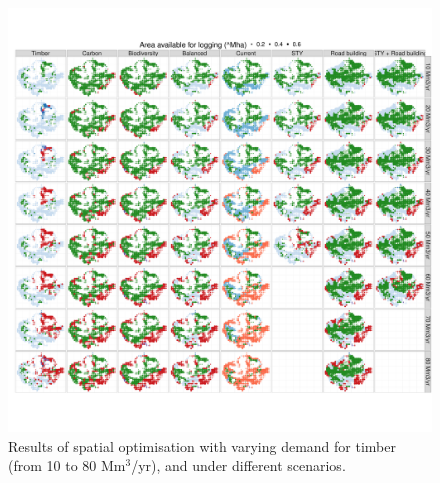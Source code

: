\documentclass{article}
\begin{document}
\begin{figure}
    \centering
    \includegraphics[width=\linewidth]{graphs/mapsChangeDemand.pdf}
    \caption{Results of spatial optimisation with varying demand for timber (from 10 to 80 Mm$^3$/yr), and under different scenarios.}
    \label{fig:mapsIncDemand}
\end{figure}
\end{document}
